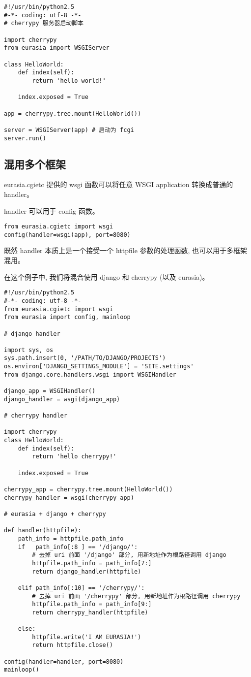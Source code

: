 \documentclass{manual}
\begin{document}
\begin{verbatim}
#!/usr/bin/python2.5
#-*- coding: utf-8 -*-
# cherrypy 服务器启动脚本

import cherrypy
from eurasia import WSGIServer

class HelloWorld:
	def index(self):
		return 'hello world!'

	index.exposed = True

app = cherrypy.tree.mount(HelloWorld())

server = WSGIServer(app) # 启动为 fcgi
server.run()
\end{verbatim}

\subsection{混用多个框架}

eurasia.cgietc 提供的 wsgi 函数可以将任意 WSGI application 转换成普通的 handler。

handler 可以用于 config 函数。

\begin{verbatim}
from eurasia.cgietc import wsgi
config(handler=wsgi(app), port=8080)
\end{verbatim}

既然 handler 本质上是一个接受一个 httpfile 参数的处理函数, 也可以用于多框架混用。

在这个例子中, 我们将混合使用 django 和 cherrypy (以及 eurasia)。

\begin{verbatim}
#!/usr/bin/python2.5
#-*- coding: utf-8 -*-
from eurasia.cgietc import wsgi
from eurasia import config, mainloop

# django handler

import sys, os
sys.path.insert(0, '/PATH/TO/DJANGO/PROJECTS')
os.environ['DJANGO_SETTINGS_MODULE'] = 'SITE.settings'
from django.core.handlers.wsgi import WSGIHandler

django_app = WSGIHandler()
django_handler = wsgi(django_app)

# cherrypy handler

import cherrypy
class HelloWorld:
	def index(self):
		return 'hello cherrypy!'

	index.exposed = True

cherrypy_app = cherrypy.tree.mount(HelloWorld())
cherrypy_handler = wsgi(cherrypy_app)

# eurasia + django + cherrypy

def handler(httpfile):
	path_info = httpfile.path_info
	if   path_info[:8 ] == '/django/':
		# 去掉 uri 前面 '/django' 部分, 用新地址作为根路径调用 django
		httpfile.path_info = path_info[7:]
		return django_handler(httpfile)

	elif path_info[:10] == '/cherrypy/':
		# 去掉 uri 前面 '/cherrypy' 部分, 用新地址作为根路径调用 cherrypy
		httpfile.path_info = path_info[9:]
		return cherrypy_handler(httpfile)

	else:
		httpfile.write('I AM EURASIA!')
		return httpfile.close()

config(handler=handler, port=8080)
mainloop()
\end{verbatim}
\end{document}
